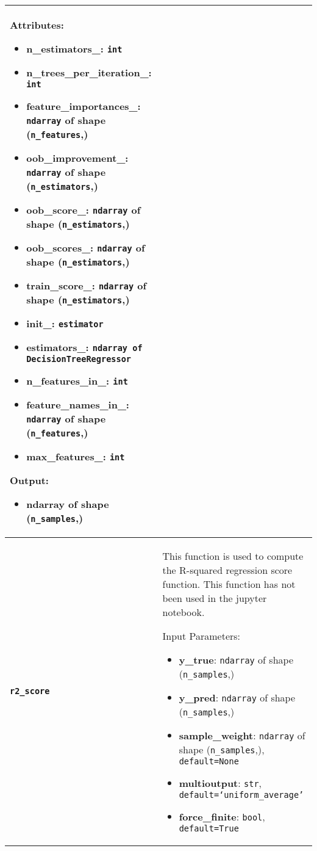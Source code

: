 \begin{longtable}{|l|p{12cm}|}
	Attributes:
	\begin{itemize}
		\item \textbf{n\_estimators\_}: \texttt{int}
		\item \textbf{n\_trees\_per\_iteration\_}: \texttt{int}
		\item \textbf{feature\_importances\_}: \texttt{ndarray} of shape (\texttt{n\_features},)
		\item \textbf{oob\_improvement\_}: \texttt{ndarray} of shape (\texttt{n\_estimators},)
		\item \textbf{oob\_score\_}: \texttt{ndarray} of shape (\texttt{n\_estimators},)
		\item \textbf{oob\_scores\_}: \texttt{ndarray} of shape (\texttt{n\_estimators},)
		\item \textbf{train\_score\_}: \texttt{ndarray} of shape (\texttt{n\_estimators},)
		\item \textbf{init\_}: \texttt{estimator}
		\item \textbf{estimators\_}: \texttt{ndarray of DecisionTreeRegressor}
		\item \textbf{n\_features\_in\_}: \texttt{int}
		\item \textbf{feature\_names\_in\_}: \texttt{ndarray} of shape (\texttt{n\_features},)
		\item \textbf{max\_features\_}: \texttt{int}
	\end{itemize}

	Output:
	\begin{itemize}
		\item \textbf{ndarray} of shape (\texttt{n\_samples},)
	\end{itemize} \\*
	\hline
	\textbf{\texttt{r2\_score}} &
	This function is used to compute the R-squared regression score function. This function has not been used in the jupyter notebook.
	
	Input Parameters:
	\begin{itemize}
		\item \textbf{y\_true}: \texttt{ndarray} of shape (\texttt{n\_samples},)
		\item \textbf{y\_pred}: \texttt{ndarray} of shape (\texttt{n\_samples},)
		\item \textbf{sample\_weight}: \texttt{ndarray} of shape (\texttt{n\_samples},), \texttt{default=None}
		\item \textbf{multioutput}: \texttt{str}, \texttt{default=`uniform\_average'}
		\item \textbf{force\_finite}: \texttt{bool}, \texttt{default=True}
	\end{itemize}


\end{longtable}
